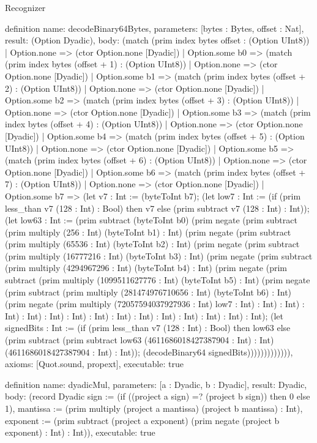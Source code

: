 \begin{lexlean}{Recognizer}
\begin{semanticmodule}
definition{
  name: decodeBinary64Bytes,
  parameters: [bytes : Bytes, offset : Nat],
  result: (Option Dyadic),
  body: (match (prim index bytes offset : (Option UInt8))
    | Option.none => (ctor Option.none [Dyadic])
    | Option.some b0 => (match (prim index bytes (offset + 1) : (Option UInt8))
      | Option.none => (ctor Option.none [Dyadic])
      | Option.some b1 => (match (prim index bytes (offset + 2) : (Option UInt8))
        | Option.none => (ctor Option.none [Dyadic])
        | Option.some b2 => (match (prim index bytes (offset + 3) : (Option UInt8))
          | Option.none => (ctor Option.none [Dyadic])
          | Option.some b3 => (match (prim index bytes (offset + 4) : (Option UInt8))
            | Option.none => (ctor Option.none [Dyadic])
            | Option.some b4 => (match (prim index bytes (offset + 5) : (Option UInt8))
              | Option.none => (ctor Option.none [Dyadic])
              | Option.some b5 => (match (prim index bytes (offset + 6) : (Option UInt8))
                | Option.none => (ctor Option.none [Dyadic])
                | Option.some b6 => (match (prim index bytes (offset + 7) : (Option UInt8))
                  | Option.none => (ctor Option.none [Dyadic])
                  | Option.some b7 => (let v7 : Int := (byteToInt b7); (let low7 : Int := (if (prim less_than v7 (128 : Int) : Bool) then v7 else (prim subtract v7 (128 : Int) : Int)); (let low63 : Int := (prim subtract (byteToInt b0) (prim negate (prim subtract (prim multiply (256 : Int) (byteToInt b1) : Int) (prim negate (prim subtract (prim multiply (65536 : Int) (byteToInt b2) : Int) (prim negate (prim subtract (prim multiply (16777216 : Int) (byteToInt b3) : Int) (prim negate (prim subtract (prim multiply (4294967296 : Int) (byteToInt b4) : Int) (prim negate (prim subtract (prim multiply (1099511627776 : Int) (byteToInt b5) : Int) (prim negate (prim subtract (prim multiply (281474976710656 : Int) (byteToInt b6) : Int) (prim negate (prim multiply (72057594037927936 : Int) low7 : Int) : Int) : Int) : Int) : Int) : Int) : Int) : Int) : Int) : Int) : Int) : Int) : Int) : Int) : Int); (let signedBits : Int := (if (prim less_than v7 (128 : Int) : Bool) then low63 else (prim subtract (prim subtract low63 (4611686018427387904 : Int) : Int) (4611686018427387904 : Int) : Int)); (decodeBinary64 signedBits))))))))))))),
  axioms: [Quot.sound, propext],
  executable: true
}

definition{
  name: dyadicMul,
  parameters: [a : Dyadic, b : Dyadic],
  result: Dyadic,
  body: (record Dyadic {sign := (if ((project a sign) =? (project b sign)) then 0 else 1), mantissa := (prim multiply (project a mantissa) (project b mantissa) : Int), exponent := (prim subtract (project a exponent) (prim negate (project b exponent) : Int) : Int)}),
  executable: true
}


\end{semanticmodule}
\end{lexlean}
